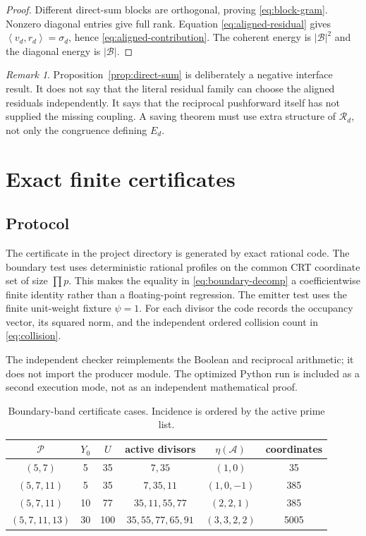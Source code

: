 \documentclass[11pt]{article}
\theoremstyle{definition}
\theoremstyle{remark}
\newtheorem{remark}[theorem]{Remark}
\newcommand{\PP}{\mathcal P}
\newcommand{\Aset}{\mathcal A}
\newcommand{\ip}[2]{\left\langle #1,#2\right\rangle}
\begin{document}
\begin{proof}
Different direct-sum blocks are orthogonal, proving \eqref{eq:block-gram}.
Nonzero diagonal entries give full rank.  Equation \eqref{eq:aligned-residual}
gives $\ip{v_d}{r_d}=\sigma_d$, hence \eqref{eq:aligned-contribution}.  The
coherent energy is $|\mathcal B|^2$ and the diagonal energy is
$|\mathcal B|$.
\end{proof}

\begin{remark}
Proposition~\ref{prop:direct-sum} is deliberately a negative interface result.
It does not say that the literal residual family can choose the aligned
residuals independently.  It says that the reciprocal pushforward itself has
not supplied the missing coupling.  A saving theorem must use extra structure
of $\mathcal R_d$, not only the congruence defining $E_d$.
\end{remark}

\section{Exact finite certificates}

\subsection{Protocol}

The certificate in the project directory is generated by exact rational code.
The boundary test uses deterministic rational profiles on the common CRT
coordinate set of size $\prod p$.  This makes the equality in
\eqref{eq:boundary-decomp} a coefficientwise finite identity rather than a
floating-point regression.  The emitter test uses the finite unit-weight
fixture $\psi=1$.  For each divisor the code records the occupancy vector,
its squared norm, and the independent ordered collision count in
\eqref{eq:collision}.

The independent checker reimplements the Boolean and reciprocal arithmetic;
it does not import the producer module.  The optimized Python run is included
as a second execution mode, not as an independent mathematical proof.

\begin{table}[t]
\centering
\caption{Boundary-band certificate cases.  Incidence is ordered by the active
prime list.}
\label{tab:boundary-cases}
\begin{tabular}{@{}c c c c c c@{}}
\toprule
$\PP$ & $Y_0$ & $U$ & active divisors & $\eta(\Aset)$ & coordinates\\
\midrule
$(5,7)$ & 5 & 35 & $7,35$ & $(1,0)$ & 35\\
$(5,7,11)$ & 5 & 35 & $7,35,11$ & $(1,0,-1)$ & 385\\
$(5,7,11)$ & 10 & 77 & $35,11,55,77$ & $(2,2,1)$ & 385\\
$(5,7,11,13)$ & 30 & 100 & $35,55,77,65,91$ & $(3,3,2,2)$ & 5005\\
\bottomrule
\end{tabular}
\end{table}
\end{document}
